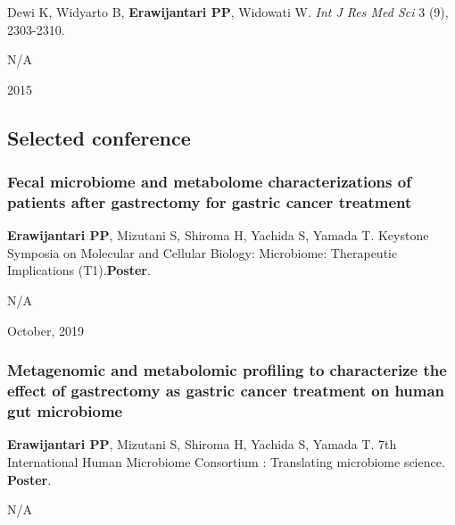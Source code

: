 \documentclass[]{article}
\begin{document}
Dewi K, Widyarto B, \textbf{Erawijantari PP}, Widowati W. \emph{Int J
Res Med Sci} 3 (9), 2303-2310.

N/A

2015

\hypertarget{selected-conference}{%
\subsection{Selected conference}\label{selected-conference}}

\hypertarget{fecal-microbiome-and-metabolome-characterizations-of-patients-after-gastrectomy-for-gastric-cancer-treatment}{%
\subsubsection{\texorpdfstring{\textbf{Fecal microbiome and metabolome
characterizations of patients after gastrectomy for gastric cancer
treatment}}{Fecal microbiome and metabolome characterizations of patients after gastrectomy for gastric cancer treatment}}\label{fecal-microbiome-and-metabolome-characterizations-of-patients-after-gastrectomy-for-gastric-cancer-treatment}}

\textbf{Erawijantari PP}, Mizutani S, Shiroma H, Yachida S, Yamada T.
Keystone Symposia on Molecular and Cellular Biology: Microbiome:
Therapeutic Implications (T1).\textbf{Poster}.

N/A

October, 2019

\hypertarget{metagenomic-and-metabolomic-profiling-to-characterize-the-effect-of-gastrectomy-as-gastric-cancer-treatment-on-human-gut-microbiome}{%
\subsubsection{\texorpdfstring{\textbf{Metagenomic and metabolomic
profiling to characterize the effect of gastrectomy as gastric cancer
treatment on human gut
microbiome}}{Metagenomic and metabolomic profiling to characterize the effect of gastrectomy as gastric cancer treatment on human gut microbiome}}\label{metagenomic-and-metabolomic-profiling-to-characterize-the-effect-of-gastrectomy-as-gastric-cancer-treatment-on-human-gut-microbiome}}

\textbf{Erawijantari PP}, Mizutani S, Shiroma H, Yachida S, Yamada T.
7th International Human Microbiome Consortium : Translating microbiome
science. \textbf{Poster}.

N/A
\end{document}
